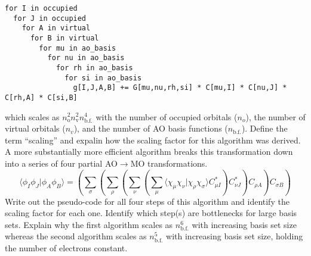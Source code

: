 \documentclass[11pt]{article}
\newcommand{\si}{\sigma}     %
\newcommand{\f}{\phi}        %
\newcommand{\x}{\chi}        %
\newcommand{\mr}[1]{\ensuremath{\mathrm{#1}}}
\newcommand{\pr}[1]{\ensuremath{\left(#1\right)}}
\newcommand{\ip}[1]{\ensuremath{\langle#1\rangle}}
\begin{document}
\begin{enumerate}
\begin{lstlisting}
for I in occupied
  for J in occupied
    for A in virtual
      for B in virtual
        for mu in ao_basis
          for nu in ao_basis
            for rh in ao_basis
              for si in ao_basis
                g[I,J,A,B] += G[mu,nu,rh,si] * C[mu,I] * C[nu,J] * C[rh,A] * C[si,B]
\end{lstlisting}
  which scales as $n_{\mr{o}}^2n_{\mr{v}}^2n_{\mr{b.f.}}^4$ with the number of occupied orbitals ($n_o$), the number of virtual orbitals ($n_v$), and the number of AO basis functions ($n_{\mr{b.f.}}$).
  Define the term ``scaling'' and expalin how the scaling factor for this algorithm was derived.\\
  A more substantially more efficient algorithm breaks this transformation down into a series of four partial AO$\rightarrow$MO transformations.
\begin{equation}
  \ip{\f_I\f_J|\f_A\f_B}
=
  \pr{
    \sum_\si
    \pr{
      \sum_\rho
      \pr{
        \sum_\nu
        \pr{
          \sum_\mu
          \ip{\x_\mu\x_\nu|\x_\rho\x_\si}
          C_{\mu I}^*
        }
        C_{\nu J}^*
      }
      C_{\rho A}
    } 
    C_{\si B}
  }
\end{equation}
  Write out the pseudo-code for all four steps of this algorithm and identify the scaling factor for each one.
  Identify which step(s) are bottlenecks for large basis sets.
  Explain why the first algorithm scales as $n_{\mr{b.f.}}^6$ with increasing basis set size whereas the second algorithm scales as $n_{\mr{b.f.}}^5$ with increasing basis set size, holding the number of electrons constant.


\end{enumerate}
\end{document}
